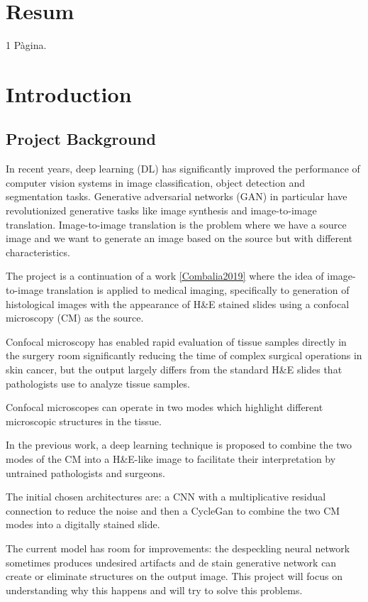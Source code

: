 \documentclass[a4paper,12pt,titlepage,twoside]{article}
\begin{document}
\clearpage
\thispagestyle{empty}
\null\newpage
{}

\section*{Resum}
1 Pàgina.
\lipsum[3-8]
\clearpage\null\newpage

\tableofcontents
\listoffigures

\hypertarget{introduction}{%
\section{Introduction}\label{introduction}}

\hypertarget{project-background}{%
\subsection{Project Background}\label{project-background}}

In recent years, deep learning (DL) has significantly improved the
performance of computer vision systems in image classification, object
detection and segmentation tasks. Generative adversarial networks (GAN)
in particular have revolutionized generative tasks like image synthesis
and image-to-image translation. Image-to-image translation is the
problem where we have a source image and we want to generate an image
based on the source but with different characteristics.

The project is a continuation of a work \ref{Combalia2019} where the idea of
image-to-image translation is applied to medical imaging, specifically
to generation of histological images with the appearance of H\&E stained
slides using a confocal microscopy (CM) as the source.

Confocal microscopy has enabled rapid evaluation of tissue samples
directly in the surgery room significantly reducing the time of complex
surgical operations in skin cancer, but the output largely differs from
the standard H\&E slides that pathologists use to analyze tissue
samples.

Confocal microscopes can operate in two modes which highlight different
microscopic structures in the tissue.

In the previous work, a deep learning technique is proposed to combine
the two modes of the CM into a H\&E-like image to facilitate their
interpretation by untrained pathologists and surgeons.

The initial chosen architectures are: a CNN with a multiplicative
residual connection to reduce the noise and then a CycleGan to combine
the two CM modes into a digitally stained slide.

The current model has room for improvements: the despeckling neural
network sometimes produces undesired artifacts and de stain generative
network can create or eliminate structures on the output image. This
project will focus on understanding why this happens and will try to
solve this problems.
\end{document}
